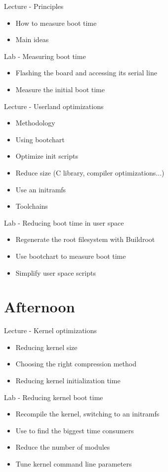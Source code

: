 \documentclass[a4paper,12pt,obeyspaces,spaces,hyphens]{article}
\begin{document}
\feagendatwocolumn
{Lecture - Principles}
{
  \begin{itemize}
  \item How to measure boot time
  \item Main ideas
  \end{itemize}
}
{Lab - Measuring boot time}
{
 \begin{itemize}
 \item Flashing the board and accessing its serial line
 \item Measure the initial boot time
 \end{itemize}
}

\feagendatwocolumn
{Lecture - Userland optimizations}
{
  \begin{itemize}
  \item Methodology
  \item Using bootchart
  \item Optimize init scripts
  \item Reduce size (C library, compiler optimizations...)
  \item Use an initramfs
  \item Toolchains
  \end{itemize}
}
{Lab - Reducing boot time in user space}
{
 \begin{itemize}
 \item Regenerate the root filesystem with Buildroot
 \item Use bootchart to measure boot time
 \item Simplify user space scripts
 \end{itemize}
}

\section{Afternoon}
\feagendatwocolumn
{Lecture - Kernel optimizations}
{
  \begin{itemize}
  \item Reducing kernel size
  \item Choosing the right compression method
  \item Reducing kernel initialization time
  \end{itemize}
}
{Lab - Reducing kernel boot time}
{
 \begin{itemize}
 \item Recompile the kernel, switching to an initramfs
 \item Use  to find the biggest
       time consumers
 \item Reduce the number of modules
 \item Tune kernel command line parameters
 \end{itemize}
}
\end{document}
